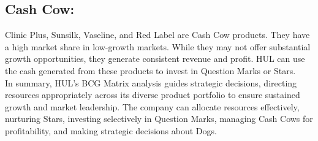 \subsection*{Cash Cow:}
Clinic Plus, Sunsilk, Vaseline, and Red Label are Cash Cow products. They have a high market share in low-growth markets. While they may not offer substantial growth opportunities, they generate consistent revenue and profit. HUL can use the cash generated from these products to invest in Question Marks or Stars.
\\\newline
In summary, HUL's BCG Matrix analysis guides strategic decisions, directing resources appropriately across its diverse product portfolio to ensure sustained growth and market leadership. The company can allocate resources effectively, nurturing Stars, investing selectively in Question Marks, managing Cash Cows for profitability, and making strategic decisions about Dogs.